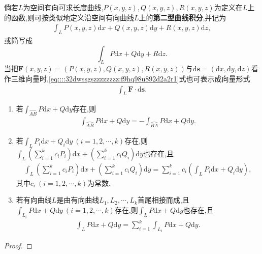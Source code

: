 \documentclass[../../main.tex]{subfiles}%
\begin{document}
\begin{definition}
倘若$L$为空间有向可求长度曲线,$P(x,y,z),Q(x,y,z),R(x,y,z)$为定义在$L$上的函数,则可按类似地定义沿空间有向曲线$L$上的\textbf{第二型曲线积分},并记为
\begin{align}
\int_L P(x,y,z)\mathrm{d}x + Q(x,y,z)\mathrm{d}y + R(x,y,z)\mathrm{d}z, \label{eq::::32dwssgszzzzzzzz:f9hq98u892d2a2r1}
\end{align}
或简写成
\[
\int_L P\mathrm{d}x + Q\mathrm{d}y + R\mathrm{d}z.
\]
当把$\boldsymbol{F}(x,y,z)=(P(x,y,z),Q(x,y,z),R(x,y,z))$与$\mathrm{d}\boldsymbol{s}=(\mathrm{d}x,\mathrm{d}y,\mathrm{d}z)$看作三维向量时,\eqref{eq::::32dwssgszzzzzzzz:f9hq98u892d2a2r1}式也可表示成向量形式
\begin{align*}
\int_L \boldsymbol{F} \cdot \mathrm{d}\boldsymbol{s}. 
\end{align*}
\end{definition}

\begin{theorem}\label{theorem:第二型曲线积分的基本性质}
\begin{enumerate}[(1)]
\item 若$\int_{\wideparen{AB}} P\mathrm{d}x + Q\mathrm{d}y$存在,则
\begin{align*}
\int_{\wideparen{AB}} P\mathrm{d}x + Q\mathrm{d}y = -\int_{\wideparen{BA}} P\mathrm{d}x + Q\mathrm{d}y. 
\end{align*}

\item 若$\int_L P_i\mathrm{d}x + Q_i\mathrm{d}y\ (i=1,2,\cdots,k)$存在,则$\int_L \left( \sum\limits_{i=1}^k c_i P_i \right)\mathrm{d}x + \left( \sum\limits_{i=1}^k c_i Q_i \right)\mathrm{d}y$也存在,且
\begin{align*}
\int_L \left( \sum_{i=1}^k c_i P_i \right)\mathrm{d}x + \left( \sum_{i=1}^k c_i Q_i \right)\mathrm{d}y = \sum_{i=1}^k c_i \left( \int_L P_i\mathrm{d}x + Q_i\mathrm{d}y \right),
\end{align*}
其中$c_i\ (i=1,2,\cdots,k)$为常数.

\item 若有向曲线$L$是由有向曲线$L_1,L_2,\cdots,L_k$首尾相接而成,且$\int_{L_i} P\mathrm{d}x + Q\mathrm{d}y\ (i=1,2,\cdots,k)$存在,则$\int_L P\mathrm{d}x + Q\mathrm{d}y$也存在,且
\begin{align*}
\int_L P\mathrm{d}x + Q\mathrm{d}y = \sum_{i=1}^k \int_{L_i} P\mathrm{d}x + Q\mathrm{d}y.
\end{align*}
\end{enumerate}
\end{theorem}
\begin{proof}



\end{proof}
\end{document}
